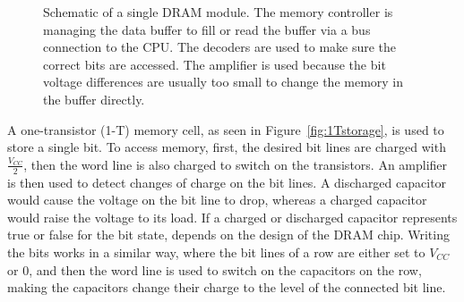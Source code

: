 \begin{figure}[!htb]
  \centering
  \caption{Schematic of a single DRAM module. The memory controller is managing
the data buffer to fill or read the buffer via a bus connection to the CPU. The
decoders are used to make sure the correct bits are accessed. The amplifier is
used because the bit voltage differences are usually too small to change the
memory in the buffer directly.}
  \label{fig:DRAMscheme}
\end{figure}

A one-transistor (1-T) memory cell, as seen in Figure~\ref{fig:1Tstorage}, is
used to store a single bit. To access memory, first, the desired bit lines are
charged with $\frac{V_{CC}}{2}$, then the word line is also charged to switch on
the transistors. An amplifier is then used to detect changes of charge on the
bit lines. A discharged capacitor would cause the voltage on the bit line to
drop, whereas a charged capacitor would raise the voltage to its load. If a
charged or discharged capacitor represents true or false for the bit state,
depends on the design of the DRAM chip. Writing the bits works in a similar way,
where the bit lines of a row are either set to $V_{CC}$ or $0$, and then the
word line is used to switch on the capacitors on the row, making the capacitors
change their charge to the level of the connected bit line.

